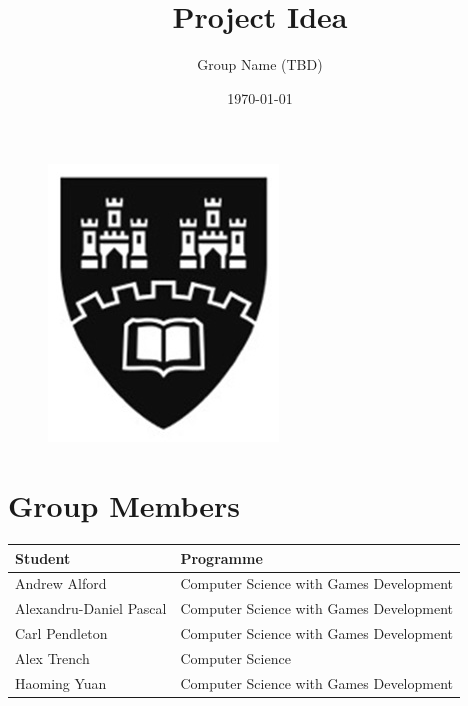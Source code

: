 \documentclass[11pt]{article}
\begin{document}

\begin{figure}[t]
	\includegraphics[scale=0.75]{northumbria_logo.jpg}
	\centering
\end{figure}	
\title{Project Idea}
\author{Group Name (TBD)}
\date{\today}
\maketitle

\newpage

\section*{Group Members}
\begin{table}[H]
	\centering
		\begin{tabular}{|l|l|}
			\hline
			\textbf{Student} & \textbf{Programme} \phantom{Computer Science with Games Development} \\ \hline
			Andrew Alford & Computer Science with Games Development              \\ \hline
			Alexandru-Daniel Pascal &  Computer Science with Games Development             \\ \hline
			Carl Pendleton &  Computer Science with Games Development             \\ \hline
			Alex Trench &  Computer Science             \\ \hline
			Haoming Yuan &  Computer Science with Games Development             \\ \hline
		\end{tabular}
\end{table}
\end{document}
